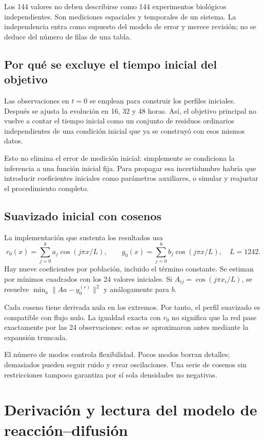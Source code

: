 \documentclass[11pt,a4paper]{report}
\begin{document}
Los 144 valores no deben describirse como 144 experimentos biológicos independientes. Son mediciones espaciales y temporales de un sistema. La independencia entra como supuesto del modelo de error y merece revisión; no se deduce del número de filas de una tabla.

\section{Por qué se excluye el tiempo inicial del objetivo}
Las observaciones en $t=0$ se emplean para construir los perfiles iniciales. Después se ajusta la evolución en 16, 32 y 48 horas. Así, el objetivo principal no vuelve a contar el tiempo inicial como un conjunto de residuos ordinarios independientes de una condición inicial que ya se construyó con esos mismos datos.

Esto no elimina el error de medición inicial: simplemente se condiciona la inferencia a una función inicial fija. Para propagar esa incertidumbre habría que introducir coeficientes iniciales como parámetros auxiliares, o simular y reajustar el procedimiento completo.

\section{Suavizado inicial con cosenos}
La implementación que sustenta los resultados usa
\begin{equation}
r_0(x)=\sum_{j=0}^{8}a_j\cos(j\pi x/L),\qquad
g_0(x)=\sum_{j=0}^{8}b_j\cos(j\pi x/L),\quad L=1242.
\end{equation}
Hay nueve coeficientes por población, incluido el término constante. Se estiman por mínimos cuadrados con los 24 valores iniciales. Si $A_{ij}=\cos(j\pi x_i/L)$, se resuelve $\min_a\|Aa-y_0^{(r)}\|^2$ y análogamente para $b$.

Cada coseno tiene derivada nula en los extremos. Por tanto, el perfil suavizado es compatible con flujo nulo. La igualdad exacta con $r_0$ no significa que la red pase exactamente por las 24 observaciones: estas se aproximaron antes mediante la expansión truncada.

El número de modos controla flexibilidad. Pocos modos borran detalles; demasiados pueden seguir ruido y crear oscilaciones. Una serie de cosenos sin restricciones tampoco garantiza por sí sola densidades no negativas.



\chapter{Derivación y lectura del modelo de reacción--difusión}
\end{document}
